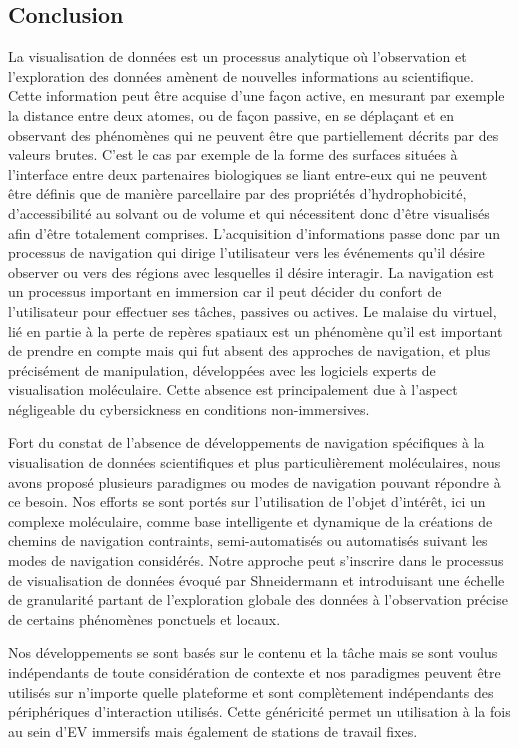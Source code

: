 \subsection{Conclusion}

La visualisation de données est un processus analytique où l'observation et l'exploration des données amènent de nouvelles informations au scientifique. Cette information peut être acquise d'une façon active, en mesurant par exemple la distance entre deux atomes, ou de façon passive, en se déplaçant et en observant des phénomènes qui ne peuvent être que partiellement décrits par des valeurs brutes. C'est le cas par exemple de la forme des surfaces situées à l'interface entre deux partenaires biologiques se liant entre-eux qui ne peuvent être définis que de manière parcellaire par des propriétés d'hydrophobicité, d'accessibilité au solvant ou de volume et qui nécessitent donc d'être visualisés afin d'être totalement comprises. L'acquisition d'informations passe donc par un processus de navigation qui dirige l'utilisateur vers les événements qu'il désire observer ou vers des régions avec lesquelles il désire interagir. La navigation est un processus important en immersion car il peut décider du confort de l'utilisateur pour effectuer ses tâches, passives ou actives. Le malaise du virtuel, lié en partie à la perte de repères spatiaux est un phénomène qu'il est important de prendre en compte mais qui fut absent des approches de navigation, et  plus précisément de manipulation, développées avec les logiciels experts de visualisation moléculaire. Cette absence est principalement due à l'aspect négligeable du cybersickness en conditions non-immersives.

Fort du constat de l'absence de développements de navigation spécifiques à la visualisation de données scientifiques et plus particulièrement moléculaires, nous avons proposé plusieurs paradigmes ou modes de navigation pouvant répondre à ce besoin. Nos efforts se sont portés sur l'utilisation de l'objet d'intérêt, ici un complexe moléculaire, comme base intelligente et dynamique de la créations de chemins de navigation contraints, semi-automatisés ou automatisés suivant les modes de navigation considérés. Notre approche peut s'inscrire dans le processus de visualisation de données évoqué par Shneidermann et introduisant une échelle de granularité partant de l'exploration globale des données à l'observation précise de certains phénomènes ponctuels et locaux.

Nos développements se sont basés sur le contenu et la tâche mais se sont voulus indépendants de toute considération de contexte et nos paradigmes peuvent être utilisés sur n'importe quelle plateforme et sont complètement indépendants des périphériques d'interaction utilisés. Cette généricité permet un utilisation à la fois au sein d'EV immersifs mais également de stations de travail fixes.

